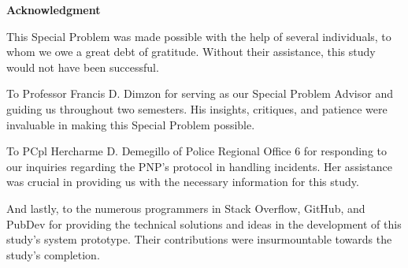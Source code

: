\doublespacing
\begin{center}
	\textbf{Acknowledgment}
\end{center}

This Special Problem was made possible with the help of several individuals, to whom we owe a great debt of gratitude. Without their assistance, this study would not have been successful.

To Professor Francis D. Dimzon for serving as our Special Problem Advisor and guiding us throughout two semesters. His insights, critiques, and patience were invaluable in making this Special Problem possible.

To PCpl Hercharme D. Demegillo of Police Regional Office 6 for responding to our inquiries regarding the PNP's protocol in handling incidents. Her assistance was crucial in providing us with the necessary information for this study.

And lastly, to the numerous programmers in Stack Overflow, GitHub, and PubDev for providing the technical solutions and ideas in the development of this study's system prototype. Their contributions were insurmountable towards the study's completion.